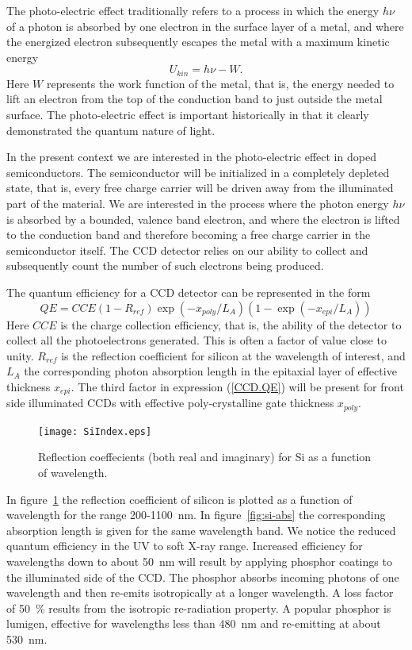 \documentclass{article}
\begin{document}
The photo-electric effect traditionally refers to a process in which
the energy $h\nu$ of a photon is absorbed by one electron in the
surface layer of a metal, and where the energized electron
subsequently escapes the metal with a maximum kinetic energy
\begin{equation}
  U_{kin} = h\nu - W.
\end{equation}
Here $W$ represents the work function of the metal, that is, the
energy needed to lift an electron from the top of the conduction band
to just outside the metal surface. The photo-electric effect is
important historically in that it clearly demonstrated the quantum
nature of light.

In the present context we are interested in the photo-electric effect
in doped semiconductors. The semiconductor will be initialized in a
completely depleted state, that is, every free charge carrier will be
driven away from the illuminated part of the material. We are
interested in the process where the photon energy $h\nu$ is absorbed
by a bounded, valence band electron, and where the electron is
lifted to the conduction band and therefore becoming a free charge
carrier in the semiconductor itself. The CCD detector relies on our 
ability to collect and subsequently count the number of such electrons
being produced.

The quantum efficiency for a CCD detector can be represented in the form
\begin{equation}
  QE = CCE(1-R_{ref}) \exp(-x_{poly}/L_A) (1-\exp(-x_{epi}/L_A))
  \label{CCD.QE}
\end{equation}
Here $CCE$ is the charge collection efficiency, that is, the ability
of the detector to collect all the photoelectrons generated. This is
often a factor of value close to unity. $R_{ref}$ is the reflection
coefficient for silicon at the wavelength of interest, and $L_A$ the
corresponding photon absorption length in the epitaxial layer of
effective thickness $x_{epi}$. The third factor in expression
(\ref{CCD.QE}) will be present for front side illuminated CCDs with
effective poly-crystalline gate thickness $x_{poly}$. 

\begin{figure}[h!]
	\centering
	\texttt{[image: SiIndex.eps]}
	\caption{Reflection coeffecients (both real and imaginary) for Si as a function
		of wavelength.}
	\label{fig:si-refl}
\end{figure}

In figure~\ref{fig:si-refl} the reflection 
coefficient of silicon is plotted as a function of wavelength for the range 
200-1100~nm. In figure~\ref{fig:si-abs} the
corresponding absorption length is given for the same wavelength band.
We notice the reduced quantum efficiency in the UV to soft X-ray
range. Increased efficiency for wavelengths down to about 50~nm will
result by applying phosphor coatings to the illuminated side of the
CCD. The phosphor absorbs incoming photons of one wavelength and then
re-emits isotropically at a longer wavelength. A loss factor of 50~\%
results from the isotropic re-radiation property. A popular phosphor
is lumigen, effective for wavelengths less than 480~nm and
re-emitting at about 530~nm. 
\end{document}
